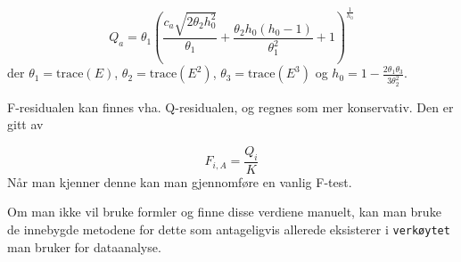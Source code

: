 \begin{equation}
Q_{a}=\theta_{1}\left(\frac{c_{a} \sqrt{2 \theta_{2} h_{0}^{2}}}{\theta_{1}}+\frac{\theta_{2} h_{0}\left(h_{0}-1\right)}{\theta_{1}^{2}}+1\right)^{\frac{1}{h_{0}}}
\end{equation}
der $\theta_1 = \textrm{trace}(E)$, $\theta_2 = \textrm{trace}(E^2)$, $\theta_3 = \textrm{trace}(E^3)$ og $h_0 = 1 - \frac{2 \theta_1 \theta_3}{3 \theta_2^2}$.

F-residualen kan finnes vha. Q-residualen, og regnes som mer konservativ. Den er gitt av

\begin{equation}
	F_{i, A} = \frac{Q_i}{K}
\end{equation}
Når man kjenner denne kan man gjennomføre en vanlig F-test.

Om man ikke vil bruke formler og finne disse verdiene manuelt, kan man bruke de innebygde metodene for dette som antageligvis allerede eksisterer i \texttt{verkøytet} man bruker for dataanalyse.

